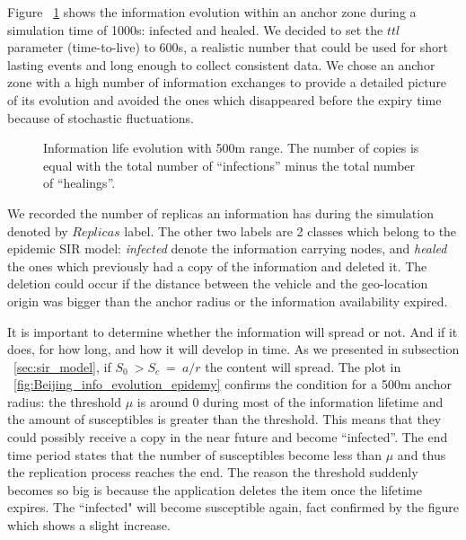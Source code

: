  Figure ~\ref{fig:Beijing_info_evolution} shows the information evolution within
 an anchor zone during a simulation time of 1000s: infected and healed. We
 decided to set the $ttl$ parameter (time-to-live) to 600s, a realistic number
 that could be used for short lasting events and long enough to collect
 consistent data. We chose an anchor zone with a high number of information
 exchanges to provide a detailed picture of its evolution and avoided the ones
 which disappeared before the expiry time because of stochastic fluctuations.
 

 
 \begin{figure}[h]
	\centering
	\def\svgwidth{\columnwidth}
	
	\caption{Information life evolution with 500m range. The number of copies
	is equal with the total number of ``infections'' minus the total number of
	``healings''.}
 	\label{fig:Beijing_info_evolution}
 \end{figure}
 
  We recorded the number of replicas an information has during the simulation
 denoted by $Replicas$ label. The other two labels are 2 classes which belong to
 the epidemic SIR model: {\it infected} denote the information carrying nodes,
 and {\it healed} the ones which previously had a copy of the information
 and deleted it. The deletion could occur if the distance between the vehicle
 and the geo-location origin was bigger than the anchor radius or the
 information availability expired.
 
 It is important to determine whether the information will spread or not. And if
 it does, for how long, and how it will develop in time. As we presented in
 subsection ~\ref{sec:sir_model}, if $S_{0}\ > S_{c}\ =\ a/r$ the content will
 spread. The plot in ~\ref{fig:Beijing_info_evolution_epidemy} confirms the
 condition for a 500m anchor radius: the threshold $\mu$ is around 0 during most
 of the information lifetime and the amount of susceptibles is greater than the
 threshold. This means that they could possibly receive a copy in the near
 future and become ``infected''. The end time period states that the number of
 susceptibles become less than $\mu$ and thus the replication process reaches
 the end. The reason the threshold suddenly becomes so big is because the
 application deletes the item once the lifetime expires. The ``infected"
 will become susceptible again, fact confirmed by the figure which shows a
 slight increase.
 
